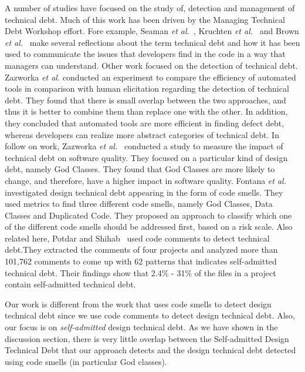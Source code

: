 \documentclass[conference]{IEEEtran}
\newcommand{\SADTD}{Self-admitted Design Technical Debt\xspace}
\begin{document}
A number of studies have focused on the study of, detection and management of technical debt. Much of this work has been driven by the Managing Technical Debt Workshop effort. Fore example, Seaman \textit{et al.}~\cite{Seaman2011}, Kruchten \textit{et al.}~\cite{Kruchten2013IWMTD} and Brown \textit{et al.}~\cite{Brown2010MTD} make several reflections about the term technical debt and how it has been used to communicate the issues that developers find in the code in a way that managers can understand. Other work focused on the detection of technical debt. Zazworka \textit{et al.} \cite{Zazworka2013CSE} conducted an experiment to compare the efficiency of automated tools in comparison with human elicitation regarding the detection of technical debt. They found that there is small overlap between the two approaches, and thus it is better to combine them than replace one with the other. In addition, they concluded that automated tools are more efficient in finding defect debt, whereas developers can realize more abstract categories of technical debt.
In follow on work, Zazworka \textit{et al.}~\cite{Zazworka2011MTD} conducted a study to measure the impact of technical debt on software quality. They focused on a particular kind of design debt, namely God Classes. They found that God Classes are more likely to change, and therefore, have a higher impact in software quality. Fontana \textit{et al.}~\cite{Fontana2012MTD} investigated design technical debt appearing in the form of code smells. They used metrics to find three different code smells, namely God Classes, Data Classes and Duplicated Code. They proposed an approach to classify which one of the different code smells should be addressed first, based on a risk scale. Also related here, Potdar and Shihab~\cite{Potdar2014ICSME} used code comments to detect technical debt.They extracted the comments of four projects and analyzed more than 101,762 comments to come up with 62  patterns that indicates self-admitted technical debt. Their findings show that 2.4\% - 31\% of the files in a project contain self-admitted technical debt.

Our work is different from the work that uses code smells to detect design technical debt since we use code comments to detect design technical debt. Also, our focus is on \emph{self-admitted} design technical debt. As we have shown in the discussion section, there is very little overlap between the \SADTD that our approach detects and the design technical debt detected using code smells (in particular God classes).
\end{document}
